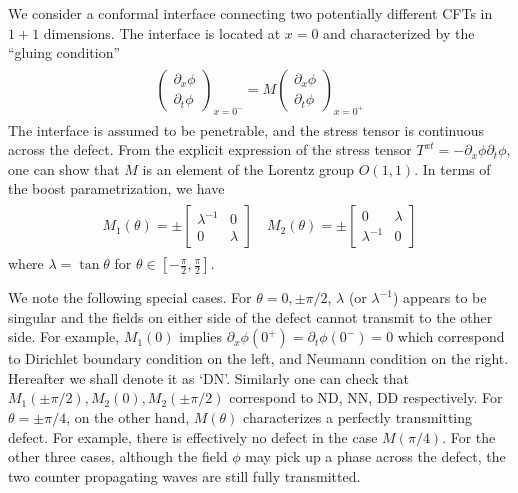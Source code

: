 We consider a conformal interface connecting two potentially different CFTs in $1+1$ dimensions. The interface is located at $x=0$ and characterized by the ``gluing condition''
\begin{eqnarray}\begin{aligned}
\label{eq:def_M}
\begin{pmatrix}
\partial_x\phi\\
\partial_t\phi
\end{pmatrix}_{x=0^-}
=M\begin{pmatrix}
\partial_x\phi\\
\partial_t\phi
\end{pmatrix}_{x=0^+}
\end{aligned}\end{eqnarray}
The interface is assumed to be penetrable, and the stress tensor is continuous across the defect. From the explicit expression of the stress tensor $T^{xt}=-\partial_x\phi\partial_t\phi$, one can show that\cite{bachas_permeable_2002} $M$ is an element of the Lorentz group $O(1,1)$. In terms of the boost parametrization, we have
\begin{eqnarray}\begin{aligned}
M_1(\theta)=\pm
\begin{bmatrix}
\lambda^{-1} & 0 \\
0 & \lambda
\end{bmatrix}\quad
M_2(\theta)=\pm
\begin{bmatrix}
0 & \lambda  \\
\lambda^{-1} & 0 
\end{bmatrix}
\end{aligned}\end{eqnarray}
where $\lambda=\tan\theta$ for $\theta\in\left[-\frac{\pi}{2},\frac{\pi}{2}\right]$. 

We note the following special cases. For $\theta=0,\pm\pi/2$, $\lambda$ (or $\lambda^{-1}$) appears to be singular and the fields on either side of the defect cannot transmit to the other side. For example, $M_1(0)$ implies $\partial_x\phi(0^+)=\partial_t\phi(0^-)=0$ which correspond to Dirichlet boundary condition on the left, and Neumann condition on the right. Hereafter we shall denote it as `DN'. Similarly one can check that $M_1(\pm\pi/2),M_2(0),M_2(\pm\pi/2)$ correspond to ND, NN, DD respectively. For $\theta=\pm\pi/4$, on the other hand, $M(\theta)$ characterizes a perfectly transmitting defect. For example, there is effectively no defect in the case $M(\pi/4)$. For the other three cases, although the field $\phi$ may pick up a phase across the defect, the two counter propagating waves are still fully transmitted.

